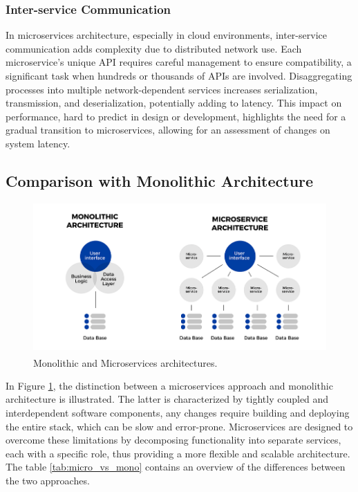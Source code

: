 \subsubsection{Inter-service Communication}
In microservices architecture, especially in cloud environments, inter-service communication adds
complexity due to distributed network use. Each microservice's unique API requires careful
management to ensure compatibility, a significant task when hundreds or thousands of APIs are
involved. Disaggregating processes into multiple network-dependent services increases serialization,
transmission, and deserialization, potentially adding to latency. This impact on performance, hard
to predict in design or development, highlights the need for a gradual transition to microservices,
allowing for an assessment of changes on system latency.

\subsection{Comparison with Monolithic Architecture}

\begin{figure}
    \centering
    \includegraphics[scale=0.5]{Pictures/3_micro_mono.png}
    \caption{Monolithic and Microservices architectures\textsuperscript{\cite{monoliths_medium}}.}
    \label{fig:3_micro_mono}
\end{figure}

In Figure \ref{fig:3_micro_mono}, the distinction between a microservices approach and monolithic
architecture is illustrated. The latter is characterized by tightly coupled and interdependent
software components, any changes require building and deploying the entire stack, which can be slow
and error-prone. Microservices are designed to overcome these limitations by decomposing
functionality into separate services, each with a specific role, thus providing a more flexible and
scalable architecture. The table \ref{tab:micro_vs_mono} contains an overview of the differences
between the two approaches.

